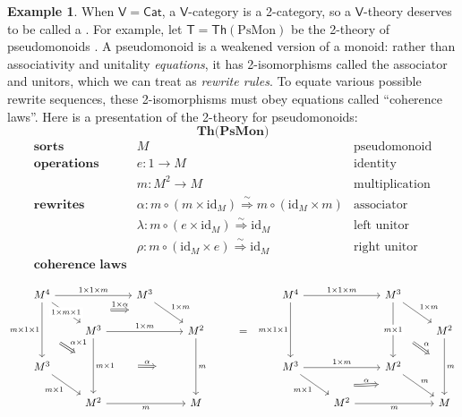 \documentclass{amsart}
\newcommand{\define}[1]{{\bf \boldmath{#1}}}
\theoremstyle{definition}
\newtheorem{example}[theorem]{Example}
\newcommand{\Th}{\mathsf{Th}}
\newcommand{\Cat}{\mathsf{Cat}}
\newcommand{\V}{\mathsf{V}}
\newcommand{\T}{\mathsf{T}}
\newcommand{\maps}{\colon}
\newcommand{\id}{\mathrm{id}}
\begin{document}
\begin{example}
When $\V = \Cat$, a $\V$-category is a 2-category, so a $\V$-theory deserves to be called a \define{2-theory}.  For example, let $\T = \Th(\mathrm{PsMon})$ be the 2-theory of pseudomonoids \cite{pseudo}.   A pseudomonoid is a weakened version of a monoid: rather than associativity and unitality \textit{equations}, it has 2-isomorphisms called the associator and unitors, which we can treat as \textit{rewrite rules}.  To equate various possible rewrite sequences, these 2-isomorphisms must obey equations called ``coherence laws''.  Here is a presentation of the 2-theory for pseudomonoids:
	\[ \textbf{Th(PsMon)} \]
	\[\begin{array}{rll}
	\textbf{sorts} & M & \text{pseudomonoid}\\
	\textbf{operations} & e\maps1 \to M & \text{identity}\\
	& m\maps M^2 \to M & \text{multiplication}\\
	\textbf{rewrites} & \alpha \colon m \circ (m \times \id_M) \stackrel{\sim}{\Longrightarrow} m \circ (\id_M \times m) & \text{associator}\\
	& \lambda\maps  m \circ (e \times \id_M) \stackrel{\sim}{\Longrightarrow} \id_M & \text{left unitor}\\
	& \rho\maps m \circ (\id_M \times e) \stackrel{\sim}{\Longrightarrow} \id_M & \text{right unitor}\\
	\textbf{coherence laws}
          \end{array}\]

        \[\begin{tikzcd}
          M^4 \ar[rr,"1\times 1\times m"] \ar[dr,"1\times m\times 1" description, ""name=a1] \ar[dd, "m\times 1\times 1",swap,""name=b1] && M^3 \ar[dr, "1\times m",""name=a2] \arrow[Rightarrow,"1\times \alpha",from=a1,to=a2,shorten >=1.3cm,shorten <=1.3cm] &&& M^4 \ar[rr, "1\times 1\times m"] \ar[dd,"m\times 1\times 1",swap,""name=d1] && M^3 \ar[dd,"m\times 1" description,""name=d2] \ar[dr,"1\times m"] %
          & \\
          & M^3 \ar[rr,"1\times m"] \ar[dd,"m\times 1",""name=b2] \arrow[Rightarrow,"\alpha\times 1",from=b1,to=b2,shorten >=0.7cm,shorten <=0.7cm] && M^2 \ar[dd,"m",""name=c1] & = & &&& M^2 \ar[dd,"m",""name=f1] \arrow[Rightarrow,"\alpha",from=d2,to=f1,shorten >=0.6cm,shorten <=0.6cm] \arrow[Rightarrow,"\alpha",from=b2,to=c1,shorten >=1.3cm,shorten <=1.3cm] \\
          M^3 \ar[dr,"m\times 1",swap] &&& && M^3 \ar[rr,"1\times m"] \ar[dr,"m\times 1",swap,,""name=e1] && M^2 \ar[dr,"m",,""name=e2] \arrow[Rightarrow,"\alpha",from=e1,to=e2,shorten >=1.3cm,shorten <=1.3cm] & \\
          & M^2 \ar[rr,"m",swap] && M && & M^2 \ar[rr,"m",swap] && M
        \end{tikzcd}\]


\end{example}
\end{document}
